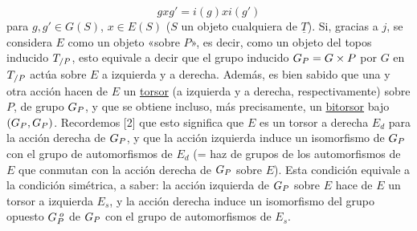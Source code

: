 \begin{equation*}
gxg' = i(g)xi(g')
\end{equation*}
para $g,g' \in G(S)$, $x \in E(S)$ ($S$ un objeto cualquiera de
$\underline{T}$). Si, gracias a $j$, se considera $E$ como un objeto
«sobre $P$», es decir, como un objeto del topos inducido
$\sisi{E_{/P}}{\underline T_{/P}}$, esto equivale a decir que el grupo
inducido $\sisi{G_P = G\times P}{G_P=G\times P}$ por $G$ en
$\sisi{\underline{T}_{/P}}{\underline T_{/P}}$ actúa sobre $E$ a
izquierda y a derecha. Además,
es bien sabido que una y otra acción hacen de $E$ un \underline{torsor}
(a izquierda y a derecha, respectivamente) sobre $P$, de grupo
$\sisi{G_P}{G_P}$,
y que se obtiene incluso, más precisamente, un \underline{bitorsor}
bajo $(\sisi{G_P}{G_P},\sisi{G_P}{G_P})$. Recordemos [2] que esto
significa que $E$ es un torsor a derecha $E_d$ para la acción derecha de
$\sisi{G_P}{G_P}$, y que la acción izquierda induce un isomorfismo de
$\sisi{G_P}{G_P}$ con el grupo de automorfismos
de $E_d$ (= haz de grupos de los automorfismos de $E$ que conmutan con
la acción derecha de $\sisi{G_P}{G_P}$ sobre $E$). Esta condición
equivale a la condición simétrica, a saber: la acción izquierda de
$\sisi{G_P}{G_P}$ sobre $E$ hace de $E$ un torsor a izquierda $E_s$, y
la acción derecha induce un isomorfismo del grupo opuesto
$\sisi{G_P^{\;o}}{G_P^{\;o}}$ de $\sisi{G_P}{G_P}$ con el grupo de
automorfismos de $E_s$.

